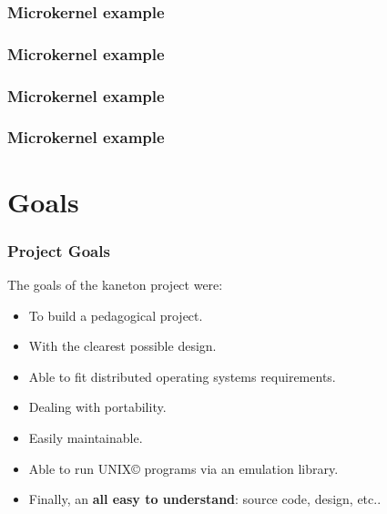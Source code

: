 {\begin{frame}
  \frametitle{Microkernel example}

  \begin{center}
  \end{center}
\end{frame}

\begin{frame}
  \frametitle{Microkernel example}

  \begin{center}
  \end{center}
\end{frame}

\begin{frame}
  \frametitle{Microkernel example}

  \begin{center}
  \end{center}
\end{frame}

\begin{frame}
  \frametitle{Microkernel example}

  \begin{center}
  \end{center}
\end{frame}


%
%

\section{Goals}


\begin{frame}
  \frametitle{Project Goals}

  The goals of the kaneton project were:

  \begin{itemize}[<+->]
    \item
      To build a pedagogical project.
    \item
      With the clearest possible design.
    \item
      Able to fit distributed operating systems requirements.
    \item
      Dealing with portability.
    \item
      Easily maintainable.
    \item
      Able to run UNIX{\scriptsize \copyright} programs via
      an emulation library.
    \item
      Finally, an \textbf{all easy to understand}: source code, design,
      etc..
  \end{itemize}
\end{frame}

}
